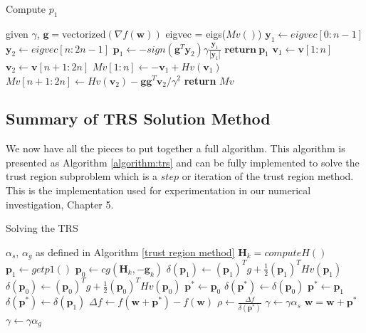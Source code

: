 \documentclass[letterpaper,12pt,titlepage,oneside,final]{book}
\begin{document}
	\begin{algorithm}
		\caption{Compute $p_{1}$}
		\begin{algorithmic}[1]
		\State given $\gamma$, $\mathbf{g} = $vectorized$(\nabla{f(\mathbf{w})})$
		\State eigvec = eigs($Mv()$)
		\State $\mathbf{y}_{1} \gets \textit{eigvec}[0:n-1]$
		\State $\mathbf{y}_{2} \gets \textit{eigvec}[n:2n-1]$
		\State $\mathbf{p}_{1} \gets -sign(\mathbf{g}^{T}\mathbf{y}_{2}) \gamma \frac{\mathbf{y}_{1}}{|\mathbf{y}_{1}|}$
		\State $\textbf{return} \ \mathbf{p}_{1}$ 
		\EndProcedure
		\State $\mathbf{v}_{1} \gets \mathbf{v}[1:n]$
		\State $\mathbf{v}_{2} \gets \mathbf{v}[n+1:2n]$
		\State $Mv[1:n] \gets -\mathbf{v}_{1} + Hv(\mathbf{v}_{1})$  
		\State $Mv[n+1:2n] \gets Hv(\mathbf{v}_{2}) - \mathbf{g}\mathbf{g}^{T}\mathbf{v}_{2}/\gamma^{2}$
		\State \textbf{return} $Mv$ 
		\EndProcedure
		\label{algorithm:p1}
	\end{algorithmic}
	\end{algorithm}  
	
	\subsection{Summary of TRS Solution Method}

	We now have all the pieces to put together a full algorithm. This algorithm is presented as Algorithm \ref{algorithm:trs} and can be fully implemented to solve the trust region subproblem \cite{adachi.paper} which is a $step$ or iteration of the trust region method. This is the implementation used for experimentation in our numerical investigation, Chapter 5.  
	
	\begin{algorithm}
		\caption{Solving the TRS}\label{algorithm:trs}
		\begin{algorithmic}[1]
			\State $\alpha_{s}$, $\alpha_{g}$ as defined in Algorithm \ref{trust region method} 
			\State $\mathbf{H}_{k} = computeH()$
			\State $\mathbf{p}_{1} \gets get p1()$
			\State $\mathbf{p}_{0} \gets cg(\mathbf{H}_{k},-\mathbf{g}_{k})$
			\State $\delta(\mathbf{p}_{1}) \gets (\mathbf{p}_{1})^{T}g + \frac{1}{2}(\mathbf{p}_{1})^{T}Hv(\mathbf{p}_{1})$
			\State $\delta(\mathbf{p}_{0}) \gets (\mathbf{p}_{0})^{T}g + \frac{1}{2}(\mathbf{p}_{0})^{T}Hv(\mathbf{p}_{0})$
			\State $\mathbf{p}^{*} \gets \mathbf{p}_{0}$
			\State $\delta(\mathbf{p}^{*}) \gets \delta(\mathbf{p}_{0})$
			\Else
			\State $\mathbf{p}^{*} \gets \mathbf{p}_{1}$
			\State $\delta(\mathbf{p}^{*}) \gets \delta(\mathbf{p}_{1})$
			\EndIf
			\State $\Delta f \gets f(\mathbf{w} + \mathbf{p}^{*}) - f(\mathbf{w})$
			\State $\rho \gets \frac{\Delta f}{\delta(\mathbf{p}^{*})}$
			\State $\gamma \gets \gamma \alpha_{s}$
			\Else 
			\State $\mathbf{w} = \mathbf{w} + \mathbf{p}^{*}$
			\State $\gamma \gets \gamma \alpha_{g}$
			\EndIf
			\EndIf
			\EndProcedure
		\end{algorithmic}
	\end{algorithm}
	 
\end{document}
